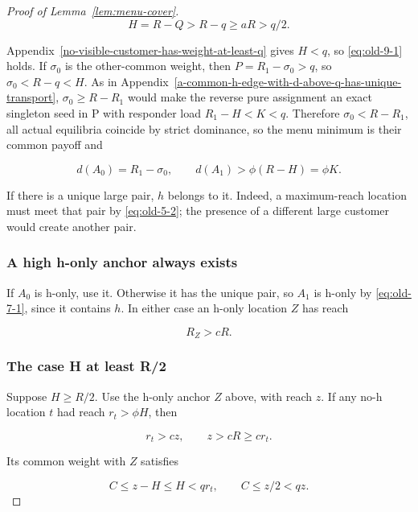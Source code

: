 \documentclass[11pt]{amsart}
\numberwithin{equation}{section}
\theoremstyle{definition}
\begin{document}
\begin{proof}[Proof of Lemma~\ref{lem:menu-cover}]
\begin{equation}
H=R-Q>R-q\ge aR>q/2. \label{eq:old-12-1}
\end{equation}

Appendix~\ref{no-visible-customer-has-weight-at-least-q} gives \(H<q\), so \eqref{eq:old-9-1} holds. If \(\sigma_0\) is the other-common weight, then \(P=R_1-\sigma_0>q\), so \(\sigma_0<R-q<H\). As in Appendix~\ref{a-common-h-edge-with-d-above-q-has-unique-transport}, \(\sigma_0\ge R-R_1\) would make the reverse pure assignment an exact singleton seed in P with responder load \(R_1-H<K<q\). Therefore \(\sigma_0<R-R_1\), all actual equilibria coincide by strict dominance, so the menu minimum is their common payoff and

\begin{equation}
d(A_0)=R_1-\sigma_0,\qquad d(A_1)>\phi(R-H)=\phi K. \label{eq:old-12-2}
\end{equation}

If there is a unique large pair, \(h\) belongs to it. Indeed, a maximum-reach location must meet that pair by \eqref{eq:old-5-2}; the presence of a different large customer would create another pair.


\subsubsection{A high h-only anchor always exists}\label{a-high-h-only-anchor-always-exists}

If \(A_0\) is h-only, use it. Otherwise it has the unique pair, so \(A_1\) is h-only by \eqref{eq:old-7-1}, since it contains \(h\). In either case an h-only location \(Z\) has reach

\begin{equation}
R_Z>cR. \label{eq:old-12-3}
\end{equation}


\subsubsection{The case H at least R/2}\label{the-case-h-at-least-r2}

Suppose \(H\ge R/2\). Use the h-only anchor \(Z\) above, with reach \(z\). If any no-h location \(t\) had reach \(r_t>\phi H\), then

\[
r_t>cz,\qquad z>cR\ge cr_t.
\]

Its common weight with \(Z\) satisfies

\[
C\le z-H\le H<qr_t,\qquad C\le z/2<qz.
\]


\end{proof}
\end{document}
